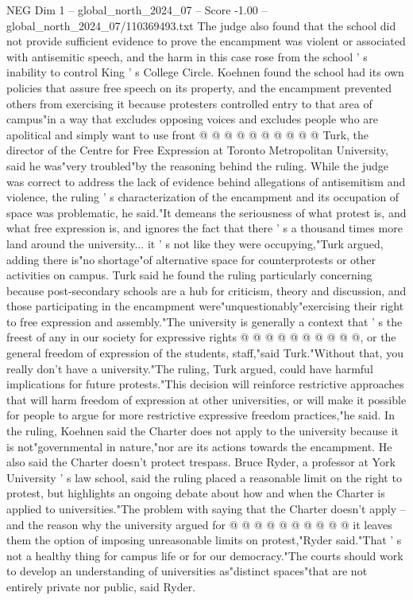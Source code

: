 \begin{textsample}{NEG Dim 1 – global\_north\_2024\_07 – Score -1.00 – global\_north\_2024\_07/110369493.txt}
The judge also found that the school did not provide sufficient evidence to prove the encampment was violent or associated with antisemitic speech, and the harm in this case rose from the school ' s inability to control King ' s College Circle.
Koehnen found the school had its own policies that assure free speech on its property, and the encampment prevented others from exercising it because protesters controlled entry to that area of campus"in a way that excludes opposing voices and excludes people who are apolitical and simply want to use front @ @ @ @ @ @ @ @ @ @ Turk, the director of the Centre for Free Expression at Toronto Metropolitan University, said he was"very troubled"by the reasoning behind the ruling.
While the judge was correct to address the lack of evidence behind allegations of antisemitism and violence, the ruling ' s characterization of the encampment and its occupation of space was problematic, he said."It demeans the seriousness of what protest is, and what free expression is, and ignores the fact that there ' s a thousand times more land around the university... it ' s not like they were occupying,"Turk argued, adding there is"no shortage"of alternative space for counterprotests or other activities on campus.
Turk said he found the ruling particularly concerning because post-secondary schools are a hub for criticism, theory and discussion, and those participating in the encampment were"unquestionably"exercising their right to free expression and assembly."The university is generally a context that ' s the freest of any in our society for expressive rights @ @ @ @ @ @ @ @ @ @, or the general freedom of expression of the students, staff,"said Turk."Without that, you really don't have a university."The ruling, Turk argued, could have harmful implications for future protests."This decision will reinforce restrictive approaches that will harm freedom of expression at other universities, or will make it possible for people to argue for more restrictive expressive freedom practices,"he said.
In the ruling, Koehnen said the Charter does not apply to the university because it is not"governmental in nature,"nor are its actions towards the encampment.
He also said the Charter doesn't protect trespass.
Bruce Ryder, a professor at York University ' s law school, said the ruling placed a reasonable limit on the right to protest, but highlights an ongoing debate about how and when the Charter is applied to universities."The problem with saying that the Charter doesn't apply -- and the reason why the university argued for @ @ @ @ @ @ @ @ @ @ it leaves them the option of imposing unreasonable limits on protest,"Ryder said."That ' s not a healthy thing for campus life or for our democracy."The courts should work to develop an understanding of universities as"distinct spaces"that are not entirely private nor public, said Ryder.

\end{textsample}
